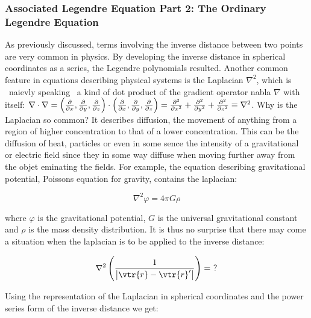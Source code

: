 \documentclass{article}
\begin{document}
    \subsubsection{Associated Legendre Equation Part 2: The Ordinary Legendre Equation}

    As previously discussed, terms involving the inverse distance between two points are very common in physics. By developing the inverse distance in spherical coordinates as a series, the Legendre
    polynomials resulted. Another common feature in equations describing physical systems is the Laplacian $\nabla^2$, which is \textendash \ naievly speaking \textendash \ a kind of dot product of
    the gradient operator nabla $\nabla$ with itself: $\nabla\cdot\nabla = \left( \pdv{}{x}, \pdv{}{y}, \pdv{}{z} \right)\cdot\left( \pdv{}{x}, \pdv{}{y}, \pdv{}{z} \right) = \pdv[order = 2]{}{x} +
    \pdv[order = 2]{}{y} + \pdv[order = 2]{}{z} \equiv \nabla^2$. Why is the Laplacian so common? It describes diffusion, the movement of anything from a region of higher concentration to that 
    of a lower concentration. This can be the diffusion of heat, particles or even in some sence the intensity of a gravitational or electric field since they in some way diffuse when moving further
    away from the objet eminating the fields. For example, the equation describing gravitational potential, Poissons equation for gravity, contains the laplacian:

    \begin{equation}
        \nabla^2\varphi = 4\pi G\rho
    \end{equation}

    where $\varphi$ is the gravitational potential, $G$ is the universal gravitational constant and $\rho$ is the mass density distribution. It is thus no surprise that there may come a situation
    when the laplacian is to be applied to the inverse distance:

    \begin{equation}
        \nabla^2\left(\frac{1}{\left| \vtr{r} - \vtr{r}' \right|}\right) = \ ?
    \end{equation}

    Using the representation of the Laplacian in spherical coordinates and the power series form of the inverse distance we get:
\end{document}
